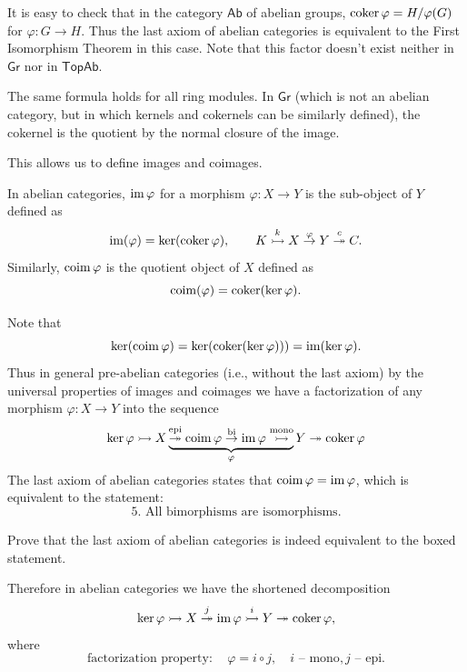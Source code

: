 \begin{example}
    It is easy to check that in the category $\mathsf{Ab}$ of abelian groups, $\operatorname{coker}\varphi=H/\varphi(G)$ for $\varphi:G\to H$. Thus the last axiom of abelian categories is equivalent to the First Isomorphism Theorem in this case. Note that this factor doesn't exist neither in $\mathsf{Gr}$ nor in $\mathsf{TopAb}$.
    
    The same formula holds for all ring modules. In $\mathsf{Gr}$ (which is not an abelian category, but in which kernels and cokernels can be similarly defined), the cokernel is the quotient by the normal closure of the image.
\end{example}

This allows us to define images and coimages.

\begin{defn}
    In abelian categories, $\operatorname{im}\varphi$ for a morphism $\varphi:X\to Y$ is the sub-object of $Y$ defined as
    \[\operatorname{im}(\varphi)=\ker(\operatorname{coker}\varphi),\quad\quad K\overset k \rightarrowtail X\overset\varphi\to Y\overset c\twoheadrightarrow C.\]
    Similarly, $\operatorname{coim}\varphi$ is the quotient object of $X$ defined as 
    \[\operatorname{coim}(\varphi)=\operatorname{coker}(\ker\varphi).\]
\end{defn}

Note that
\[\ker(\operatorname{coim}\varphi)=\ker(\operatorname{coker}(\ker\varphi)))=\operatorname{im}(\ker\varphi).\]
Thus in general pre-abelian categories (i.e., without the last axiom) by the universal properties of images and coimages we have a factorization of any morphism $\varphi:X\to Y$ into the sequence
\[\ker\varphi\rightarrowtail X\underbrace{\overset{\text{epi}}\twoheadrightarrow\operatorname{coim}\varphi\overset{\text{bi}}\to\operatorname{im}\varphi\overset{\text{mono}}\rightarrowtail}_\varphi Y\twoheadrightarrow\operatorname{coker}\varphi \]
The last axiom of abelian categories states that $\operatorname{coim}\varphi = \operatorname{im}\varphi$, which is equivalent to the statement:
\[\boxed{\text{5. All bimorphisms are isomorphisms.}}\]
\begin{xca}
    Prove that the last axiom of abelian categories is indeed equivalent to the boxed statement.
\end{xca}
Therefore in abelian categories we have the shortened decomposition
\[\ker\varphi\rightarrowtail X \overset{j}\twoheadrightarrow\operatorname{im}\varphi\overset{i}\rightarrowtail Y\twoheadrightarrow \operatorname{coker}\varphi,\]
where
\[\text{factorization property}:\quad \varphi=i\circ j,\quad i\text{ -- mono}, j\text{ -- epi}.\]

